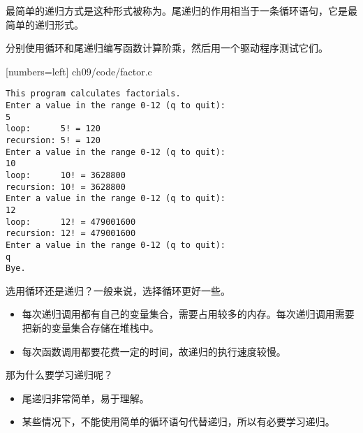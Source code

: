 \begin{frame}[fragile]
最简单的递归方式是这种形式被称为。尾递归的作用相当于一条循环语句，它是最简单的递归形式。
\end{frame}

\begin{frame}[fragile]
分别使用循环和尾递归编写函数计算阶乘，然后用一个驱动程序测试它们。
\end{frame}

\begin{frame}
  
  [numbers=left]
  {ch09/code/factor.c}
\end{frame}


\begin{frame}[fragile]
\begin{lstlisting}
This program calculates factorials.
Enter a value in the range 0-12 (q to quit):
5
loop:      5! = 120
recursion: 5! = 120
Enter a value in the range 0-12 (q to quit):
10
loop:      10! = 3628800
recursion: 10! = 3628800
Enter a value in the range 0-12 (q to quit):
12
loop:      12! = 479001600
recursion: 12! = 479001600
Enter a value in the range 0-12 (q to quit):
q
Bye.
\end{lstlisting}
\end{frame}

\begin{frame}[fragile]
{\Large 选用循环还是递归？}\pause 一般来说，选择循环更好一些。
\pause
\vspace{0.1in}

\begin{itemize}
\item 每次递归调用都有自己的变量集合，需要占用较多的内存。每次递归调用需要把新的变量集合存储在堆栈中。\\[0.1in]
\item 每次函数调用都要花费一定的时间，故递归的执行速度较慢。
\end{itemize}
\end{frame}

\begin{frame}[fragile]
{\Large 那为什么要学习递归呢？}\pause 
\vspace{0.1in}

\begin{itemize}
\item 尾递归非常简单，易于理解。\\[0.1in]
\item 某些情况下，不能使用简单的循环语句代替递归，所以有必要学习递归。
\end{itemize}

\end{frame}

